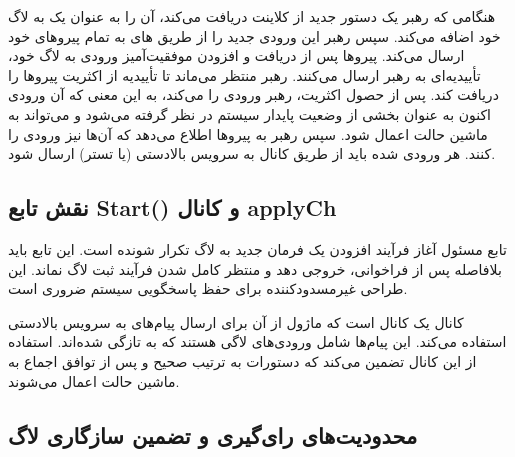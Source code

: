 \documentclass[12pt,a4paper]{article}
\begin{document}
هنگامی که رهبر یک دستور جدید از کلاینت دریافت می‌کند، آن را به عنوان یک  به لاگ خود اضافه می‌کند. سپس رهبر این ورودی جدید را از طریق های  به تمام پیروهای خود ارسال می‌کند. پیروها پس از دریافت و افزودن موفقیت‌آمیز ورودی به لاگ خود، تأییدیه‌ای  به رهبر ارسال می‌کنند. رهبر منتظر می‌ماند تا تأییدیه از اکثریت پیروها را دریافت کند. پس از حصول اکثریت، رهبر ورودی را  می‌کند، به این معنی که آن ورودی اکنون به عنوان بخشی از وضعیت پایدار سیستم در نظر گرفته می‌شود و می‌تواند به ماشین حالت اعمال شود. سپس رهبر به پیروها اطلاع می‌دهد که آن‌ها نیز ورودی را  کنند. هر ورودی  شده باید از طریق کانال  به سرویس بالادستی (یا تستر) ارسال شود.

\subsection{نقش تابع Start() و کانال applyCh}

تابع  مسئول آغاز فرآیند افزودن یک فرمان جدید به لاگ تکرار شونده است. این تابع باید بلافاصله پس از فراخوانی، خروجی دهد و منتظر کامل شدن فرآیند ثبت لاگ نماند. این طراحی غیرمسدودکننده برای حفظ پاسخگویی سیستم ضروری است.

کانال  یک کانال  است که ماژول  از آن برای ارسال پیام‌های  به سرویس بالادستی استفاده می‌کند. این پیام‌ها شامل ورودی‌های لاگی هستند که به تازگی  شده‌اند. استفاده از این کانال تضمین می‌کند که دستورات به ترتیب صحیح و پس از توافق اجماع به ماشین حالت اعمال می‌شوند.

\subsection{محدودیت‌های رای‌گیری و تضمین سازگاری لاگ}
\end{document}

